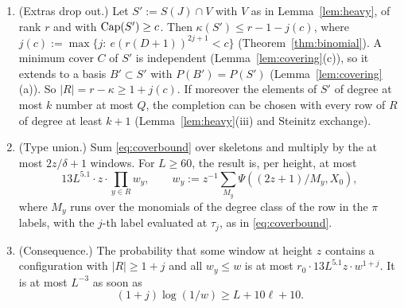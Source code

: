 \begin{lemma}\label{lem:reduction}
\begin{enumerate}[label=\textup{(\roman*)}]
\item (Extras drop out.) Let $S':=S(J)\cap V$ with $V$ as in Lemma~\ref{lem:heavy}, of rank $r$ and with $\operatorname{Cap}(S')\ge c$. Then
  $\kappa(S')\le r-1-j(c)$, where $j(c):=\max\{j:\ e(r(D+1))^{2j+1}<c\}$ (Theorem~\ref{thm:binomial}). A minimum cover $C$ of $S'$
  is independent (Lemma~\ref{lem:covering}(c)), so it extends to a basis $B'\subset S'$ with $P(B')=P(S')$
  (Lemma~\ref{lem:covering}(a)). So $|R|=r-\kappa\ge1+j(c)$. If moreover the elements of $S'$ of degree at most $k$ number at most
  $Q$, the completion can be chosen with every row of $R$ of degree at least $k+1$ (Lemma~\ref{lem:heavy}(iii) and Steinitz
  exchange).
\item (Type union.) Sum \eqref{eq:coverbound} over skeletons and multiply by the at most $2z/\delta+1$ windows. For $L\ge60$, the result
  is, per height, at most
  \begin{equation}\label{eq:typeunion}
  13L^{5.1}\cdot z\cdot\prod_{y\in R}w_y,\qquad w_y:=z^{-1}\sum_{M_y}\Psi((2z+1)/M_y,X_0),
  \end{equation}
  where $M_y$ runs over the monomials of the degree class of the row in the $\pi$ labels, with the $j$-th label evaluated
  at $\tau_j$, as in \eqref{eq:coverbound}.
\item (Consequence.) The probability that some window at height $z$ contains a configuration with $|R|\ge1+j$ and all
  $w_y\le w$ is at most $r_0\cdot13L^{5.1}z\cdot w^{1+j}$. It is at most $L^{-3}$ as soon as
  \begin{equation}\label{eq:criterion}
  (1+j)\log(1/w)\ge L+10\ell+10.
  \end{equation}
\end{enumerate}
\end{lemma}

